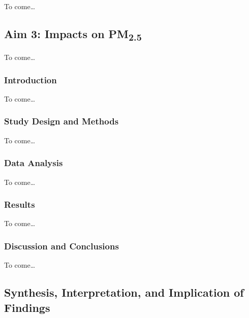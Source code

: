 \documentclass[
  letterpaper,
  DIV=11,
  numbers=noendperiod]{scrartcl}
\begin{document}
To come\ldots{}

\hypertarget{aim-3-impacts-on-pm2.5}{%
\subsection{\texorpdfstring{Aim 3: Impacts on
PM\textsubscript{2.5}}{Aim 3: Impacts on PM2.5}}\label{aim-3-impacts-on-pm2.5}}

To come\ldots{}

\hypertarget{introduction-3}{%
\subsubsection{Introduction}\label{introduction-3}}

To come\ldots{}

\hypertarget{study-design-and-methods-2}{%
\subsubsection{Study Design and
Methods}\label{study-design-and-methods-2}}

To come\ldots{}

\hypertarget{data-analysis-2}{%
\subsubsection{Data Analysis}\label{data-analysis-2}}

To come\ldots{}

\hypertarget{results-2}{%
\subsubsection{Results}\label{results-2}}

To come\ldots{}

\hypertarget{discussion-and-conclusions-2}{%
\subsubsection{Discussion and
Conclusions}\label{discussion-and-conclusions-2}}

To come\ldots{}

\hypertarget{synthesis-interpretation-and-implication-of-findings}{%
\subsection{Synthesis, Interpretation, and Implication of
Findings}\label{synthesis-interpretation-and-implication-of-findings}}
\end{document}
